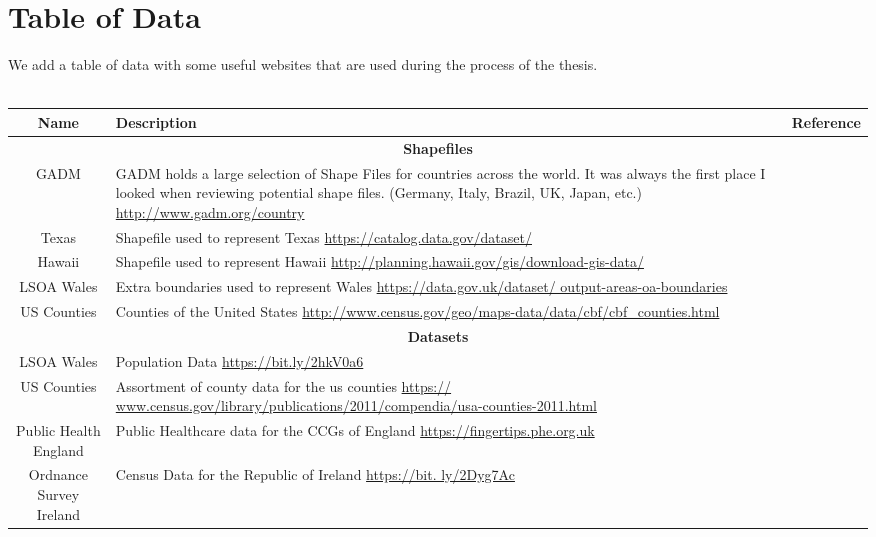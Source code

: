 \section{Table of Data}
We add a table of data with some useful websites that are used during the process of the thesis. \\ ~ \\
\begin{scriptsize}
\begin{tabularx}{1\textwidth}{|c|X|r|} \hline
Name & Description & Reference \\ \hline
\multicolumn{3}{|c|}{\textbf{Shapefiles}} \\ \hline
GADM & GADM holds a large selection of Shape Files for countries across the world. It was always the first place I looked when reviewing potential shape files. (Germany, Italy, Brazil, UK, Japan, etc.) \newline \url{http://www.gadm.org/country} & \cite{GAA} \\ \hline
Texas & Shapefile used to represent Texas \newline \url{https://catalog.data.gov/dataset/} & \cite{Texas} \\ \hline
Hawaii & Shapefile used to represent Hawaii \newline \url{http://planning.hawaii.gov/gis/download-gis-data/}& \cite{hawaii} \\ \hline
LSOA Wales & Extra boundaries used to represent Wales \newline \url{https://data.gov.uk/dataset/
output-areas-oa-boundaries}& \cite{wales} \\ \hline
US Counties & Counties of the United States \newline \url{http://www.census.gov/geo/maps-data/data/cbf/cbf_counties.html}& \cite{USCB} \\ \hline
\multicolumn{3}{|c|}{\textbf{Datasets}} \\ \hline
LSOA Wales& Population Data \newline \url{https://bit.ly/2hkV0a6}&\cite{ONS}\\ \hline
US Counties& Assortment of county data for the us counties \newline \url{https://
www.census.gov/library/publications/2011/compendia/usa-counties-2011.html}&\cite{USCB2}\\ \hline
Public Health England & Public Healthcare data for the CCGs of England \newline \url{https://fingertips.phe.org.uk}& \cite{publicHealthEngland}\\ \hline
Ordnance Survey Ireland& Census Data for the Republic of Ireland \newline \url{https://bit.
ly/2Dyg7Ac}&\cite{electoralDivisions}\\ \hline
\end{tabularx}
\end{scriptsize}


